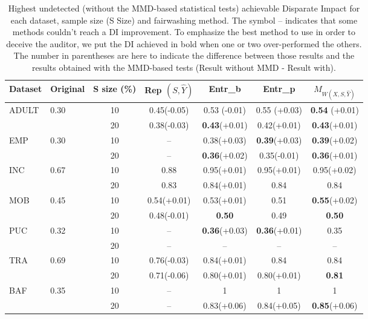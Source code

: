 \documentclass[runningheads, orivec]{llncs}
\begin{document}
\begin{table}[h!]
    \centering
    \caption{Highest undetected (without the MMD-based statistical tests) achievable Disparate Impact for each dataset, sample size (S Size) and fairwashing method. The symbol -- indicates that some methods couldn't reach a DI improvement. To emphasize the best method to use in order to deceive the auditor, we put the DI achieved in bold when one or two over-performed the others. The number in parentheses are here to indicate the difference between those results and the results obtained with the MMD-based tests (Result without MMD - Result with).}
    \label{app:tab:highest_undetected_unbiasing_woMMD}
    \begin{tabular}{ll c cccc}
\toprule
Dataset & Original & S size (\%) & Rep $(S, \widehat{Y})$ & Entr\_b & Entr\_p & $M_{W(X,S,\widehat{Y})}$ \\
\midrule
ADULT & 0.30 & 10 & 0.45(-0.05) & 0.53 (-0.01) & 0.55 (+0.03) & \textbf{0.54} (+0.01) \\
      &      & 20 & 0.38(-0.03) & \textbf{0.43}(+0.01) & 0.42(+0.01) & \textbf{0.43}(+0.01) \\
EMP   & 0.30 & 10 & --   & 0.38(+0.03) & \textbf{0.39}(+0.03) & \textbf{0.39}(+0.02) \\
      &      & 20 & --   & \textbf{0.36}(+0.02) & 0.35(-0.01) & \textbf{0.36}(+0.01) \\
INC   & 0.67 & 10 & 0.88 & 0.95(+0.01) & 0.95(+0.01) & 0.95(+0.02) \\
      &      & 20 & 0.83 & 0.84(+0.01) & 0.84 & 0.84 \\
MOB   & 0.45 & 10 & 0.54(+0.01) & 0.53(+0.01) & 0.51 & \textbf{0.55}(+0.02) \\
      &      & 20 & 0.48(-0.01) & \textbf{0.50} & 0.49 & \textbf{0.50} \\
PUC   & 0.32 & 10 & --   & \textbf{0.36}(+0.03) & \textbf{0.36}(+0.01) & 0.35 \\
      &      & 20 & --   & --   & --   & --   \\
TRA   & 0.69 & 10 & 0.76(-0.03) & 0.84(+0.01) & 0.84 & 0.84 \\
      &      & 20 & 0.71(-0.06) & 0.80(+0.01) & 0.80(+0.01) & \textbf{0.81} \\
BAF   & 0.35 & 10 & --   & 1    & 1    & 1    \\
      &      & 20 & --   & 0.83(+0.06) & 0.84(+0.05) & \textbf{0.85}(+0.06) \\
\bottomrule
\end{tabular}    
\end{table}
\end{document}
